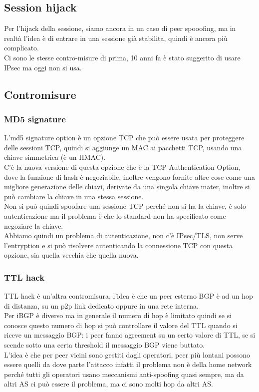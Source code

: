 \documentclass[12pt, oneside]{extbook} %
\begin{document}
\subsection{Session hijack}
Per l'hijack della sessione, siamo ancora in un caso di peer spooofing, ma in realtà l'idea è di entrare in una sessione già stabilita, quindi è ancora più complicato.
\\Ci sono le stesse contro-misure di prima, 10 anni fa è stato suggerito di usare IPsec ma oggi non si usa.
\subsection{Contromisure}
\subsubsection{MD5 signature}
L'md5 signature option è un opzione TCP che può essere usata per proteggere delle sessioni TCP, quindi si aggiunge un MAC ai pacchetti TCP, usando una chiave simmetrica (è un HMAC).
\\C'è la nuova versione di questa opzione che è la TCP Authentication Option, dove la funzione di hash è negoziabile, inoltre vengono fornite altre cose come una migliore generazione delle chiavi, derivate da una singola chiave mater, inoltre si può cambiare la chiave in una stessa sessione.
\\Non si può quindi spoofare una sessione TCP perché non si ha la chiave, è solo autenticazione ma il problema è che lo standard non ha specificato come negoziare la chiave.
\\Abbiamo quindi un problema di autenticazione, non c'è IPsec/TLS, non serve l'entryption e si può risolvere autenticando la connessione TCP con questa opzione, sia quella vecchia che quella nuova.

\subsubsection{TTL hack}
TTL hack è un'altra contromisura, l'idea è che un peer esterno BGP è ad un hop di distanza, su un p2p link dedicato oppure in una rete interna.
\\Per iBGP è diverso ma in generale il numero di hop è limitato quindi se si conosce questo numero di hop si può controllare il valore del TTL quando si riceve un messaggio BGP: i peer fanno agreement su un certo valore di TTL, se si scende sotto una certa threshold il messaggio BGP viene buttato.
\\L'idea è che per peer vicini sono gestiti dagli operatori, peer più lontani possono essere quelli da dove parte l'attacco infatti il problema non è della home network perché tutti gli operatori usano meccanismi anti-spoofing quasi sempre, ma da altri AS ci può essere il problema, ma ci sono molti hop da altri AS.
\end{document}
